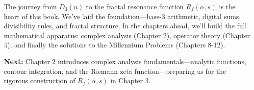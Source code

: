 The journey from $D_3(n)$ to the fractal resonance function $R_f(\alpha, s)$ is the heart of this book. We've laid the foundation—base-3 arithmetic, digital sums, divisibility rules, and fractal structure. In the chapters ahead, we'll build the full mathematical apparatus: complex analysis (Chapter 2), operator theory (Chapter 4), and finally the solutions to the Millennium Problems (Chapters 8-12).

\textbf{Next:} Chapter 2 introduces complex analysis fundamentals—analytic functions, contour integration, and the Riemann zeta function—preparing us for the rigorous construction of $R_f(\alpha, s)$ in Chapter 3.

